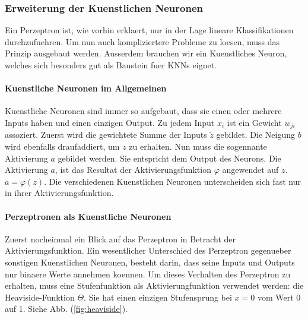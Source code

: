 \documentclass[../main]{subfiles}
\begin{document}

\subsubsection{Erweiterung der Kuenstlichen Neuronen}\label{sec:kuenstlicheNeuronen}
Ein Perzeptron ist, wie vorhin erklaert, nur in der Lage lineare Klassifikationen
durchzufuehren. Um nun auch kompliziertere Probleme zu loesen, muss das Prinzip
ausgebaut werden. Ausserdem brauchen wir ein Kuenstliches Neuron, welches sich
besonders gut als Baustein fuer KNNs eignet.

\paragraph{Kuenstliche Neuronen im Allgemeinen}
Kuenstliche Neuronen sind immer so aufgebaut, dass sie einen oder mehrere Inputs
haben und einen einzigen Output. Zu jedem Input $x_i$ ist ein Gewicht
$w_{ji}$ assoziert. Zuerst wird die gewichtete Summe der Inputs $\tilde{z}$ gebildet.
Die Neigung $b$ wird ebenfalls draufaddiert, um $z$ zu erhalten. Nun muss
die sogennante Aktivierung $a$ gebildet werden. Sie entspricht dem Output des Neurons.
Die Aktivierung $a$, ist das Resultat der Aktivierungsfunktion $\varphi$ angewendet
auf $z$. $a = \varphi(z)$. Die verschiedenen Kuenstlichen Neuronen unterscheiden
sich fast nur in ihrer Aktivierungsfunktion.

\paragraph{Perzeptronen als Kuenstliche Neuronen}
Zuerst nocheinmal ein Blick auf das Perzeptron in Betracht der Aktivierungsfunktion.
Ein wesentlicher Unterschied des Perzeptron gegenueber sonstigen Kuenstlichen
Neuronen, besteht darin, dass seine Inputs und Outputs nur binaere Werte
annehmen koennen. Um dieses Verhalten des Perzeptron zu erhalten,
muss eine Stufenfunktion als Aktivierungfunktion verwendet werden: die Heaviside-Funktion $\Theta$.
Sie hat einen einzigen Stufensprung bei $x=0$ vom Wert 0 auf 1. Siehe Abb. (\ref{fig:heaviside}).
\end{document}
